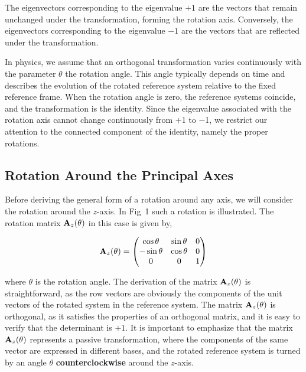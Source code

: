 \documentclass[12pt]{article}
\begin{document}
The eigenvectors corresponding to the eigenvalue $+1$ are the vectors that remain unchanged
under the transformation, forming the rotation axis. Conversely, the eigenvectors
corresponding to the eigenvalue $-1$ are the vectors that are reflected under the
transformation.

In physics, we assume that an orthogonal transformation varies continuously with the
parameter $\theta$ the rotation angle. This angle typically depends on time and describes the
evolution of the rotated reference system relative to the fixed reference frame. When the rotation angle
is zero, the reference systems coincide, and the transformation is the identity. Since the eigenvalue associated
with the rotation axis cannot change continuously from +1 to −1, we restrict our attention
to the connected component of the identity, namely the proper rotations.

\subsection{Rotation Around the Principal Axes}

Before deriving the general form of a rotation around any axis, we will consider the rotation
around the $z$-axis. In Fig~1 such a rotation is illustrated.
 The rotation matrix $\vb{A}_z(\theta)$ in this case is given by,

\[
  \vb{A}_z(\theta) =
  \begin{pmatrix}
    \cos\theta  & \sin\theta & 0 \\
    -\sin\theta & \cos\theta & 0 \\
    0           & 0          & 1
  \end{pmatrix}
\]

where $\theta$ is the rotation angle. The derivation of the matrix $\vb{A}_z(\theta)$ is
straightforward, as the row vectors are obviously the components of the unit vectors of the
rotated system in the reference system. The matrix $\vb{A}_z(\theta)$ is orthogonal, as it
satisfies the properties of an orthogonal matrix, and it is easy to verify that the
determinant is $+1$. It is important to emphasize that the matrix $\vb{A}_z(\theta)$
represents a passive transformation, where the components of the same vector are expressed
in different bases, and the rotated reference system is turned by an angle $\theta$
\textbf{counterclockwise} around the $z$-axis.
\end{document}
